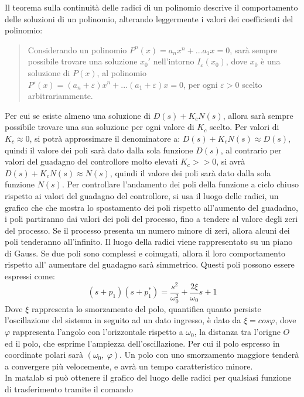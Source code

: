\documentclass{article}
\numberwithin{equation}{subsection}
\begin{document}
Il teorema sulla continuità delle radici di un polinomio descrive il comportamento delle soluzioni di un polinomio, alterando leggermente i 
valori dei coefficienti del polinomio:
\begin{quotation}
    Considerando un polinomio $P^n(x)=a_nx^n+...a_1x=0$, sarà sempre possibile trovare una soluzione $x_0'$ nell'intorno $I_{\varepsilon}(x_0)$, dove $x_0$ 
    è una soluzione di $P(x)$, al polinomio $P'(x)=(a_n+\varepsilon)x^n+...(a_1+\varepsilon)x=0$, per ogni $\varepsilon>0$ scelto arbitrariammente. 
\end{quotation} 
Per cui se esiste almeno una soluzione di $D(s)+K_cN(s)$, allora sarà sempre possibile trovare una sua soluzione per ogni valore di $K_c$ scelto. 
Per valori di $K_c\approx0$, si potrà approssimare il denominatore a: $D(s)+K_cN(s)\approx D(s)$, quindi il valore dei poli sarà dato dalla sola 
funzione $D(s)$, al contrario per valori del guadagno del controllore molto elevati  $K_c>>0$, si avrà $D(s)+K_cN(s)\approx N(s)$, quindi il valore 
dei poli sarà dato dalla sola funzione $N(s)$. 
Per controllare l'andamento dei poli della funzione a ciclo chiuso rispetto ai valori del guadagno del controllore, si usa il luogo delle radici, un 
grafico che che mostra lo spostamento dei poli rispetto all'aumento del guadadno, i poli partiranno dai valori dei poli del processo, fino a tendere 
al valore degli zeri del processo. Se il processo presenta un numero minore di zeri, allora alcuni dei poli tenderanno all'infinito. 
Il luogo della radici viene rappresentato su un piano di Gauss. Se due poli sono complessi e coinugati, allora il loro comportamento rispetto all'
aumentare del guadagno sarà simmetrico. Questi poli possono essere espressi come: 
\begin{equation}
    (s+p_1)(s+p_1^*)=\displaystyle\frac{s^2}{\omega_0^2}+\frac{2\xi}{\omega_0}s+1
\end{equation}
Dove $\xi$ rappresenta lo smorzamento del polo, quantifica quanto persiste l'oscillazione del sistema in seguito ad un dato ingresso, è dato da 
$\xi=cos\varphi$, dove $\varphi$ rappresenta l'angolo con l'orizzontale rispetto a $\omega_0$, la distanza tra l'origne $O$ ed il polo, che esprime 
l'ampiezza dell'oscillazione. 
Per cui il polo espresso in coordinate polari sarà $(\omega_0,\:\varphi)$. 
Un polo con uno smorzamento maggiore tenderà a convergere più velocemente, e avrà un tempo caratteristico minore. \\
In matalab si può ottenere il grafico del luogo delle radici per qualsiasi funzione di trasferimento tramite il comando 
\end{document}
